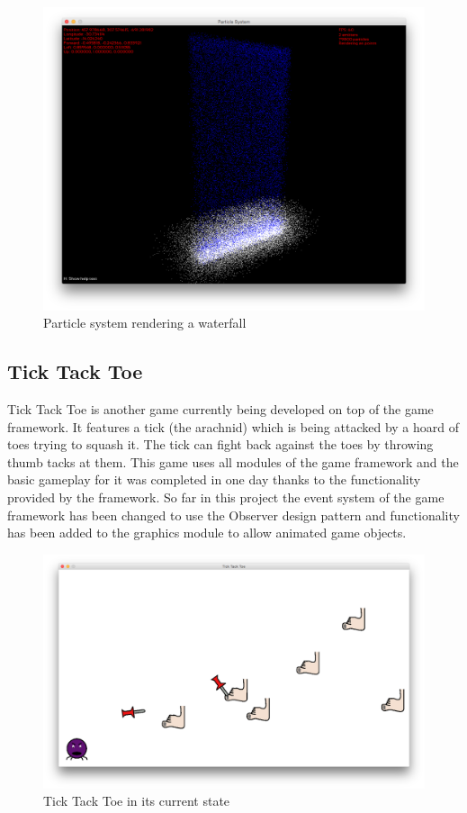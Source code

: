 \documentclass[]{report}
\begin{document}
		\begin{figure}[H]
			\centering
			\includegraphics[scale=0.25]{particlesystem}
			\caption{Particle system rendering a waterfall}
			\label{particlesystem}
		\end{figure}
		
		\subsection{Tick Tack Toe}
		Tick Tack Toe is another game currently being developed on top of the game framework. It features a tick (the arachnid) which is being attacked by a hoard of toes trying to squash it. The tick can fight back against the toes by throwing thumb tacks at them. This game uses all modules of the game framework and the basic gameplay for it was completed in one day thanks to the functionality provided by the framework. So far in this project the event system of the game framework has been changed to use the Observer design pattern and functionality has been added to the graphics module to allow animated game objects.
		
		\begin{figure}[H]
			\centering
			\includegraphics[scale=0.25]{ticktacktoe}
			\caption{Tick Tack Toe in its current state}
			\label{ticktacktoe}
		\end{figure}
	
\end{document}

